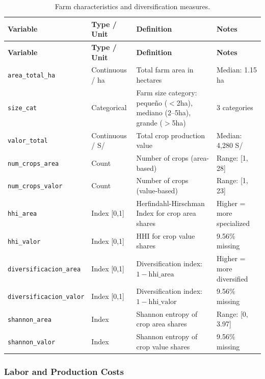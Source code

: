 \documentclass[11pt,a4paper]{article}
\begin{document}
\begin{longtable}{L{2.5cm}L{2.5cm}L{5.5cm}L{3.5cm}}
\caption{Farm characteristics and diversification measures.} \\
\toprule
\textbf{Variable} & \textbf{Type / Unit} & \textbf{Definition} & \textbf{Notes} \\
\midrule
\endfirsthead
\toprule
\textbf{Variable} & \textbf{Type / Unit} & \textbf{Definition} & \textbf{Notes} \\
\midrule
\endhead
\bottomrule
\endlastfoot
\texttt{area\_total\_ha} & Continuous / ha & Total farm area in hectares & Median: 1.15 ha \\
\texttt{size\_cat} & Categorical & Farm size category: pequeño ($<$2ha), mediano (2--5ha), grande ($>$5ha) & 3 categories \\
\texttt{valor\_total} & Continuous / S/ & Total crop production value & Median: 4,280 S/ \\
\texttt{num\_crops\_area} & Count & Number of crops (area-based) & Range: [1, 28] \\
\texttt{num\_crops\_valor} & Count & Number of crops (value-based) & Range: [1, 23] \\
\texttt{hhi\_area} & Index [0,1] & Herfindahl-Hirschman Index for crop area shares & Higher = more specialized \\
\texttt{hhi\_valor} & Index [0,1] & HHI for crop value shares & 9.56\% missing \\
\texttt{diversificacion\_area} & Index [0,1] & Diversification index: $1 - \mathrm{hhi\_area}$ & Higher = more diversified \\
\texttt{diversificacion\_valor} & Index [0,1] & Diversification index: $1 - \mathrm{hhi\_valor}$ & 9.56\% missing \\
\texttt{shannon\_area} & Index & Shannon entropy of crop area shares & Range: [0, 3.97] \\
\texttt{shannon\_valor} & Index & Shannon entropy of crop value shares & 9.56\% missing \\
\end{longtable}

\subsubsection{Labor and Production Costs}
\end{document}
